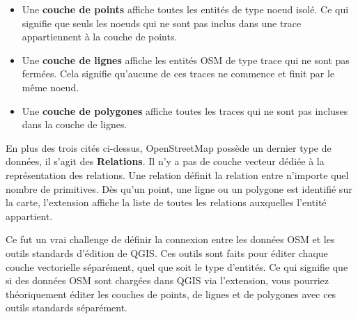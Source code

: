 \begin{itemize}
\item Une \textbf{couche de points} affiche toutes les entités de type noeud isolé. Ce qui signifie que seuls les noeuds qui ne sont pas inclus dans une trace appartiennent à la couche de points.
\item Une \textbf{couche de lignes} affiche les entités OSM de type trace qui ne sont pas fermées. Cela signifie qu'aucune de ces traces ne commence et finit par le même noeud.
\item Une \textbf{couche de polygones} affiche toutes les traces qui ne sont pas incluses dans la couche de lignes.
\end{itemize}

En plus des trois cités ci-dessus, OpenStreetMap possède un dernier type de données, il s'agit des \textbf{Relations}. Il n'y a pas de couche vecteur dédiée à la représentation des relations. Une relation définit la relation entre n'importe quel nombre de primitives. Dès qu'un point, une ligne ou un polygone est identifié sur la carte, l'extension affiche la liste de toutes les relations auxquelles l'entité appartient.

Ce fut un vrai challenge de définir la connexion entre les données OSM et les outils standards d'édition de QGIS. Ces outils sont faits pour éditer chaque couche vectorielle séparément, quel que soit le type d'entités. Ce qui signifie que si des données OSM sont chargées dans QGIS via l'extension, vous pourriez théoriquement éditer les couches de points, de lignes et de polygones avec ces outils standards séparément.

